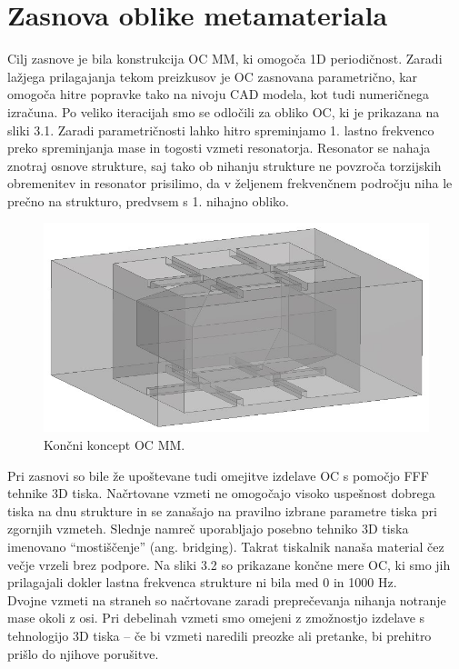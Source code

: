 \documentclass[12pt]{report}
\begin{document}
\section{Zasnova oblike metamateriala}
Cilj zasnove je bila konstrukcija \ac{OC} \ac{MM}, ki omogoča 1D periodičnost. Zaradi lažjega prilagajanja tekom preizkusov je \ac{OC} zasnovana parametrično, kar omogoča hitre popravke
tako na nivoju CAD modela, kot tudi numeričnega izračuna. Po veliko iteracijah smo se odločili za obliko \ac{OC}, ki je prikazana na sliki 3.1. Zaradi parametričnosti lahko hitro spreminjamo 1. lastno frekvenco preko 
spreminjanja mase in togosti vzmeti resonatorja. Resonator se nahaja znotraj osnove strukture, saj tako ob nihanju strukture ne povzroča torzijskih obremenitev in resonator prisilimo, da v 
željenem frekvenčnem področju niha le prečno na strukturo, predvsem s 1. nihajno obliko.
\begin{figure}[H]
  \centering
  \includegraphics[scale=0.6]{Images/BaseCell_v4.JPG}
  \caption{Končni koncept \ac{OC} \ac{MM}.}
\end{figure}
\noindent Pri zasnovi so bile že upoštevane tudi omejitve izdelave \ac{OC} s pomočjo FFF tehnike 3D tiska. Načrtovane vzmeti ne omogočajo visoko uspešnost dobrega tiska
na dnu strukture in se zanašajo na pravilno izbrane parametre tiska pri zgornjih vzmeteh. Slednje namreč uporabljajo posebno tehniko 3D tiska imenovano ``mostiščenje'' (ang. bridging). Takrat tiskalnik nanaša material čez
večje vrzeli brez podpore. Na sliki 3.2 so prikazane končne mere \ac{OC}, ki smo jih prilagajali dokler lastna frekvenca strukture ni bila med 0 in 1000 Hz.
\\
Dvojne vzmeti na straneh so načrtovane zaradi preprečevanja nihanja notranje mase okoli z osi. Pri debelinah vzmeti smo omejeni z zmožnostjo izdelave s tehnologijo 3D tiska -- če bi
vzmeti naredili preozke ali pretanke, bi prehitro prišlo do njihove porušitve.
\end{document}
